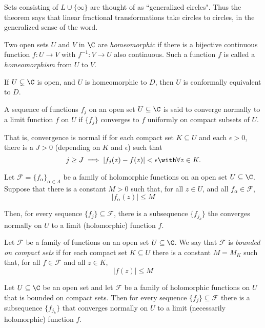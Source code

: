 Sets consisting of $L\cup\{\infty\}$ are thought of as ``generalized circles".
Thus the theorem says that linear fractional transformations take circles to
circles, in the generalized sense of the word.

\label{c429605}

Two open sets $U$ and $V$ in $\C$ are \textit{homeomorphic} if there is a
bijective continuous function $f:U\to V$ with $f^{-1}:V\to U$ also continuous.
Such a function $f$ is called a \textit{homeomorphism} from $U$ to $V$.

\label{faf0cb5}

If $U\subsetneq\C$ is open, and $U$ is homeomorphic to $D$, then $U$ is
conformally equivalent to $D$.

\label{fe96ff9}

A sequence of functions $f_j$ on an open set $U\subseteq\C$ is said to converge
normally to a limit function $f$ on $U$ if $\{f_j\}$ converges to $f$ uniformly
on compact subsets of $U$.

That is, convergence is normal if for each compact set $K\subseteq U$ and each
$\epsilon>0$, there is a $J>0$ (depending on $K$ and $\epsilon$) such that
$$
  j\geq J\implies|f_j(z)-f(z)|<\epsilon\with\forall z\in K.
$$

\label{b4a14fe}

Let $\mathcal F=\{f_\alpha\}_{\alpha\in A}$ be a family of holomorphic
functions on an open set $U\subseteq\C$. Suppose that there is a constant $M>0$
such that, for all $z\in U$, and all $f_\alpha\in\mathcal F$,
$$
  |f_\alpha(z)|\leq M
$$

Then, for every sequence $\{f_j\}\subseteq\mathcal F$, there is a subsequence
$\{f_{j_k}\}$ the converges normally on $U$ to a limit (holomorphic) function
$f$.

\label{f152035}

Let $\mathcal F$ be a family of functions on an open set $U\subseteq\C$. We say
that $\mathcal F$ is \textit{bounded on compact sets} if for each compact set
$K\subseteq U$ there is a constant $M=M_K$ such that, for all $f\in\mathcal F$
and all $z\in K$,
$$
  |f(z)|\leq M
$$

\label{ad5126c}

Let $U\subseteq\C$ be an open set and let $\mathcal F$ be a family of
holomorphic functions on $U$ that is bounded on compact sets. Then for every
sequence $\{f_j\}\subseteq\mathcal F$ there is a subsequence $\{f_{j_k}\}$ that
converges normally on $U$ to a limit (necessarily holomorphic) function $f$.

